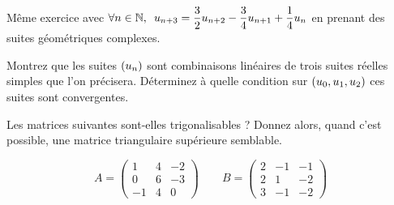 \begin{corr}
\end{corr}

\begin{exos}[Exercice 18]
Même exercice avec \(\quantifs{\forall n\in\N}u_{n+3}=\dfrac{3}{2}u_{n+2}-\dfrac{3}{4}u_{n+1}+\dfrac{1}{4}u_n\) en prenant des suites géométriques complexes.

Montrez que les suites \(\left(u_n\right)\) sont combinaisons linéaires de trois suites réelles simples que l'on précisera. Déterminez à quelle condition sur \(\left(u_0,u_1,u_2\right)\) ces suites sont convergentes.
\end{exos}

\begin{corr}
\end{corr}

\begin{exos}[Exercice 19]
Les matrices suivantes sont-elles trigonalisables ? Donnez alors, quand c'est possible, une matrice triangulaire supérieure semblable.

\[A=\begin{pmatrix}
1 & 4 & -2 \\
0 & 6 & -3 \\
-1 & 4 & 0
\end{pmatrix}\qquad B=\begin{pmatrix}
2 & -1 & -1 \\
2 & 1 & -2 \\
3 & -1 & -2
\end{pmatrix}\]
\end{exos}

\begin{corr}
\end{corr}


